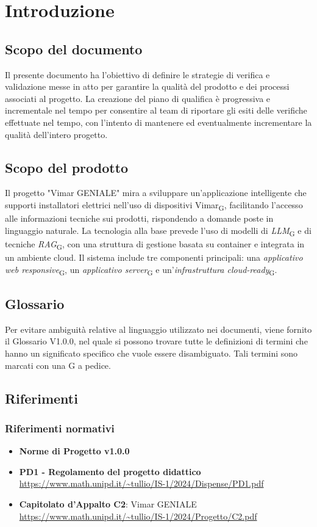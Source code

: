 \section{Introduzione}
\subsection{Scopo del documento}
Il presente documento ha l'obiettivo di definire le strategie di verifica e validazione messe in atto per garantire la qualità del prodotto e dei processi associati al progetto. La creazione del piano di qualifica è progressiva e incrementale nel tempo
per consentire al team di riportare gli esiti delle verifiche effettuate nel tempo, con l'intento di mantenere ed eventualmente incrementare la qualità dell'intero progetto.
\subsection{Scopo del prodotto}
Il progetto "Vimar GENIALE" mira a sviluppare un'applicazione intelligente che supporti installatori elettrici nell'uso di dispositivi Vimar\textsubscript{G}, facilitando l'accesso alle informazioni tecniche sui prodotti, rispondendo a domande poste in linguaggio naturale.
La tecnologia alla base prevede l'uso di modelli di \textit{LLM}\textsubscript{G} e di tecniche \textit{RAG}\textsubscript{G}, con una struttura di gestione basata su container e integrata in un ambiente cloud.
Il sistema include tre componenti principali: una \textit{applicativo web responsive}\textsubscript{G}, un \textit{applicativo server}\textsubscript{G} e un'\textit{infrastruttura cloud-ready}\textsubscript{G}. 
\subsection{Glossario}
Per evitare ambiguità relative al linguaggio utilizzato nei documenti, viene fornito il Glossario V1.0.0, nel quale si possono trovare tutte le definizioni di termini che hanno un significato specifico che vuole essere disambiguato. Tali termini sono marcati con una G a pedice.
\subsection{Riferimenti}
\subsubsection{Riferimenti normativi}
\begin{itemize}
    \item \textbf{Norme di Progetto v1.0.0}
    \item \textbf{PD1 - Regolamento del progetto didattico} \\
    \url{https://www.math.unipd.it/~tullio/IS-1/2024/Dispense/PD1.pdf} 
    \item \textbf{Capitolato d'Appalto C2}: Vimar GENIALE \\
    \url{https://www.math.unipd.it/~tullio/IS-1/2024/Progetto/C2.pdf}
    \end{itemize}
